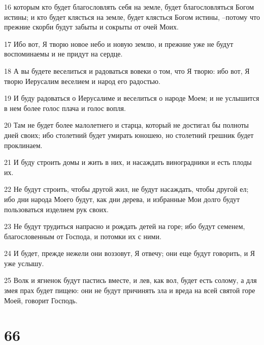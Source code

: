 \par 16 которым кто будет благословлять себя на земле, будет благословляться Богом истины; и кто будет клясться на земле, будет клясться Богом истины, --потому что прежние скорби будут забыты и сокрыты от очей Моих.
\par 17 Ибо вот, Я творю новое небо и новую землю, и прежние уже не будут воспоминаемы и не придут на сердце.
\par 18 А вы будете веселиться и радоваться вовеки о том, что Я творю: ибо вот, Я творю Иерусалим веселием и народ его радостью.
\par 19 И буду радоваться о Иерусалиме и веселиться о народе Моем; и не услышится в нем более голос плача и голос вопля.
\par 20 Там не будет более малолетнего и старца, который не достигал бы полноты дней своих; ибо столетний будет умирать юношею, но столетний грешник будет проклинаем.
\par 21 И буду строить домы и жить в них, и насаждать виноградники и есть плоды их.
\par 22 Не будут строить, чтобы другой жил, не будут насаждать, чтобы другой ел; ибо дни народа Моего будут, как дни дерева, и избранные Мои долго будут пользоваться изделием рук своих.
\par 23 Не будут трудиться напрасно и рождать детей на горе; ибо будут семенем, благословенным от Господа, и потомки их с ними.
\par 24 И будет, прежде нежели они воззовут, Я отвечу; они еще будут говорить, и Я уже услышу.
\par 25 Волк и ягненок будут пастись вместе, и лев, как вол, будет есть солому, а для змея прах будет пищею: они не будут причинять зла и вреда на всей святой горе Моей, говорит Господь.

\chapter{66}

